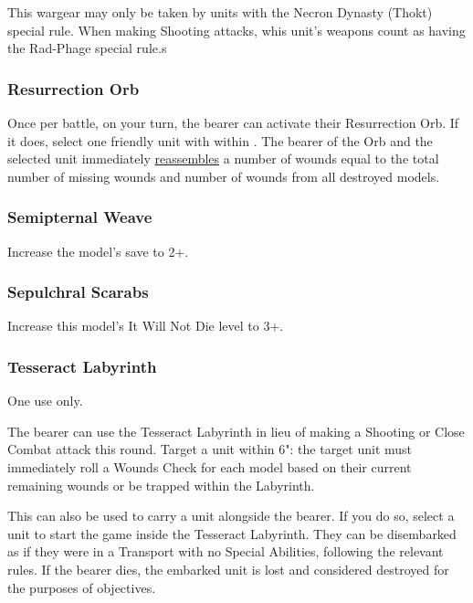 This wargear may only be taken by units with the Necron Dynasty (Thokt) special rule. When making Shooting attacks, whis unit's weapons count as having the Rad-Phage special rule.s

\subsubsection{Resurrection Orb} \label{Resurrection Orb}

Once per battle, on your turn, the bearer can activate their Resurrection Orb. If it does, select one friendly unit with  within . The bearer of the Orb and the selected unit immediately \textcolor{violet}{\hyperref[Reanimation Protocols]{reassembles}} a number of wounds equal to the total number of missing wounds and number of wounds from all destroyed models.

\subsubsection{Semipternal Weave} \label{Sempiternal Weave}

Increase the model's save to 2+.

\subsubsection{Sepulchral Scarabs} \label{Sepulchral Scarabs}

Increase this model's It Will Not Die level to 3+.

\subsubsection{Tesseract Labyrinth} \label{Tesseract Labyrinth}

One use only.

The bearer can use the Tesseract Labyrinth in lieu of making a Shooting or Close Combat attack this round. Target a unit within 6": the target unit must immediately roll a Wounds Check for each model based on their current remaining wounds or be trapped within the Labyrinth.

This can also be used to carry a unit alongside the bearer. If you do so, select a unit to start the game inside the Tesseract Labyrinth. They can be disembarked as if they were in a Transport with no Special Abilities, following the relevant rules. If the bearer dies, the embarked unit is lost and considered destroyed for the purposes of objectives.


